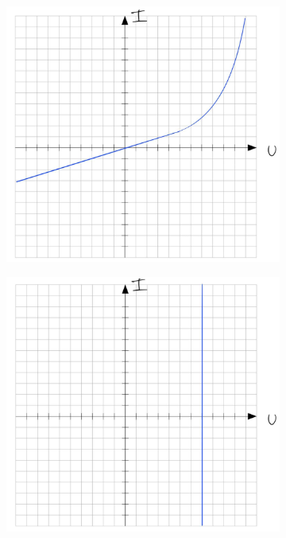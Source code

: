 \begin{figure}[H]
\begin{subfigure}[b]{0.45\textwidth}
        \caption{}
        \label{fig:VA_C_c}
    \end{subfigure}
    \hfill
    \begin{subfigure}[b]{0.45\textwidth}
        \includegraphics[width=\textwidth]{figs/Voraufgaben/Cd.jpg}
        \caption{}
        \label{fig:VA_C_d}
    \end{subfigure}
    \vspace{0.5em}
    \begin{subfigure}[b]{0.45\textwidth}
        \includegraphics[width=\textwidth]{figs/Voraufgaben/Ce.jpg}

\end{subfigure}
\end{figure}
